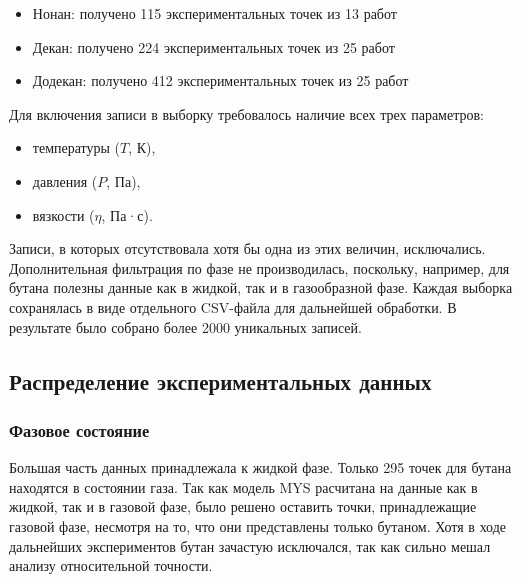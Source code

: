 \documentclass[a4paper,12pt]{article}
\begin{document}
\begin{itemize}
      \item Нонан: получено 115 экспериментальных точек из 13 работ \cite{acs.jced.7b00121,acs.jced.7b00650,j.fluid.2010.10.009,j.jct.2004.09.021,j.jct.2005.03.024,j.jct.2005.10.011,j.jct.2013.09.017,je200757a,je300899n,je400250u,je400835u,je700202h,je700428f}
      \item Декан: получено 224 экспериментальных точек из 25 работ \cite{acs.jced.5b00270,acs.jced.6b00542,acs.jced.7b00121,acs.jced.7b00650,j.fluid.2010.10.009,j.jct.2003.12.005,j.jct.2004.09.021,j.jct.2005.03.024,j.jct.2005.10.011,j.jct.2007.05.016,j.jct.2008.02.005,j.jct.2013.05.014,j.jct.2013.09.017,je034208m,je0501585,je060389r,je300899n,je400250u,je400835u,je4008926,je800348s,je800417q,je800635g,s10765-005-5572-8,s10765-008-0542-6}
      \item Додекан: получено 412 экспериментальных точек из 25 работ \cite{acs.jced.6b00391,acs.jced.6b00542,acs.jced.6b00688,acs.jced.7b00201,acs.jced.7b00466,acs.jced.7b00650,acs.jced.7b00866,acs.jced.8b00008,acs.jced.8b00438,acs.jced.8b01135,acs.jced.8b01233,acs.jced.9b00187,j.fluid.2015.07.022,j.jct.2003.12.005,j.jct.2004.09.021,j.jct.2005.03.024,j.jct.2013.12.022,j.jct.2014.02.012,j.jct.2015.12.021,je034208m,je060491o,je200757a,je400493x,je400835u,je5000132}
    \end{itemize}
    
    Для включения записи в выборку требовалось наличие всех трех параметров:
    \begin{itemize}
      \item температуры (\( T \), К),
      \item давления (\( P \), Па),
      \item вязкости (\( \eta \), Па·с).
    \end{itemize}
    
    Записи, в которых отсутствовала хотя бы одна из этих величин, исключались. Дополнительная фильтрация по фазе не производилась, поскольку, например, для бутана полезны данные как в жидкой, так и в газообразной фазе. Каждая выборка сохранялась в виде отдельного CSV-файла для дальнейшей обработки. В результате было собрано более 2000 уникальных записей.

  \subsection{Распределение экспериментальных данных}
    \subsubsection{Фазовое состояние}
      Большая часть данных принадлежала к жидкой фазе. Только 295 точек для бутана находятся в состоянии газа. Так как модель MYS расчитана на данные как в жидкой, так и в газовой фазе, было решено оставить точки, принадлежащие газовой фазе, несмотря на то, что они представлены только бутаном. Хотя в ходе дальнейших экспериментов бутан зачастую исключался, так как сильно мешал анализу относительной точности.
\end{document}
